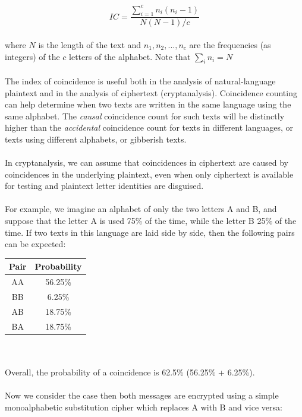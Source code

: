 \documentclass[Lau,binding=0.6cm,oneside]{sapthesis}
\begin{document}
\begin{equation}
IC = \frac{\sum\limits_{i=1}^{c} n_i(n_i-1)}{N(N-1)/c}
\end{equation}
\ \\
where $N$ is the length of the text and $n_1,n_2,...,n_c$ are the frequencies (as integers) of the $c$ letters of the alphabet. Note that $\sum_{i} n_i=N$ \\\\

The index of coincidence is useful both in the analysis of natural-language plaintext and in the analysis of ciphertext (cryptanalysis). Coincidence counting can help determine when two texts are written in the same language using the same alphabet. The \textit{causal} coincidence count for such texts will be distinctly higher than the \textit{accidental} coincidence count for texts in different languages, or texts using different alphabets, or gibberish texts.\\\\
In cryptanalysis, we can assume that coincidences in ciphertext are caused by coincidences in the underlying plaintext, even when only ciphertext is available for testing and plaintext letter identities are disguised.\\\\
For example, we imagine an alphabet of only the two letters A and B, and suppose that the letter A is used 75\% of the time, while the letter B 25\% of the time. If two texts in this language are laid side by side, then the following pairs can be expected:\\

\begin{center}
 \begin{tabular}{||c c||} 
 \hline
 Pair & Probability\\ [0.5ex] 
 \hline\hline
 AA & 56.25\% \\ 
 \hline
 BB & 6.25\% \\
 \hline
 AB & 18.75\% \\
 \hline
 BA & 18.75\% \\
 \hline
\end{tabular}
\end{center}
\ \\\\

Overall, the probability of a coincidence is 62.5\% (56.25\% + 6.25\%).\\\\
Now we consider the case then both messages are encrypted using a simple monoalphabetic substitution cipher which replaces A with B and vice versa:\\
\end{document}
